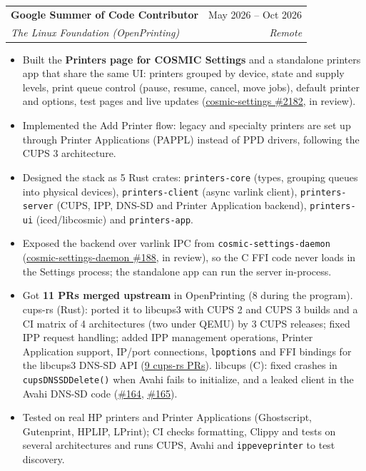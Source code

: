 \documentclass[letterpaper,11pt]{article}
\makeatletter
\newcommand{\resumeItem}[1]{
  \item\small{
    {#1 \vspace{-2pt}}
  }
}
\newcommand{\resumeSubheading}[4]{
  \vspace{-2pt}\item
    \begin{tabular*}{0.97\textwidth}[t]{l@{\extracolsep{\fill}}r}
      \textbf{#1} & #2 \\
      \textit{\small#3} & \textit{\small #4} \\
    \end{tabular*}\vspace{-7pt}
}
\newcommand{\resumeItemListStart}{\begin{itemize}}
\newcommand{\resumeItemListEnd}{\end{itemize}\vspace{-5pt}}
\newcommand{\cvlink}[2]{\href{#1}{\underline{#2}}}
\makeatother
\begin{document}
    \resumeSubheading
      {Google Summer of Code Contributor}{May 2026 -- Oct 2026}
      {The Linux Foundation (OpenPrinting)}{Remote}
      \resumeItemListStart
        \resumeItem{Built the \textbf{Printers page for COSMIC Settings} and a standalone printers app that share the same UI: printers grouped by device, state and supply levels, print queue control (pause, resume, cancel, move jobs), default printer and options, test pages and live updates (\cvlink{https://github.com/pop-os/cosmic-settings/pull/2182}{cosmic-settings \#2182}, in review).}
        \resumeItem{Implemented the Add Printer flow: legacy and specialty printers are set up through Printer Applications (PAPPL) instead of PPD drivers, following the CUPS 3 architecture.}
        \resumeItem{Designed the stack as 5 Rust crates: \texttt{printers-core} (types, grouping queues into physical devices), \texttt{printers-client} (async varlink client), \texttt{printers-server} (CUPS, IPP, DNS-SD and Printer Application backend), \texttt{printers-ui} (iced/libcosmic) and \texttt{printers-app}.}
        \resumeItem{Exposed the backend over varlink IPC from \texttt{cosmic-settings-daemon} (\cvlink{https://github.com/pop-os/cosmic-settings-daemon/pull/188}{cosmic-settings-daemon \#188}, in review), so the C FFI code never loads in the Settings process; the standalone app can run the server in-process.}
        \resumeItem{Got \textbf{11 PRs merged upstream} in OpenPrinting (8 during the program). cups-rs (Rust): ported it to libcups3 with CUPS 2 and CUPS 3 builds and a CI matrix of 4 architectures (two under QEMU) by 3 CUPS releases; fixed IPP request handling; added IPP management operations, Printer Application support, IP/port connections, \texttt{lpoptions} and FFI bindings for the libcups3 DNS-SD API (\cvlink{https://github.com/OpenPrinting/cups-rs/pulls?q=is:pr+author:Abd002+is:merged}{9 cups-rs PRs}). libcups (C): fixed crashes in \texttt{cupsDNSSDDelete()} when Avahi fails to initialize, and a leaked client in the Avahi DNS-SD code (\cvlink{https://github.com/OpenPrinting/libcups/pull/164}{\#164}, \cvlink{https://github.com/OpenPrinting/libcups/pull/165}{\#165}).}
        \resumeItem{Tested on real HP printers and Printer Applications (Ghostscript, Gutenprint, HPLIP, LPrint); CI checks formatting, Clippy and tests on several architectures and runs CUPS, Avahi and \texttt{ippeveprinter} to test discovery.}
      \resumeItemListEnd
\end{document}
